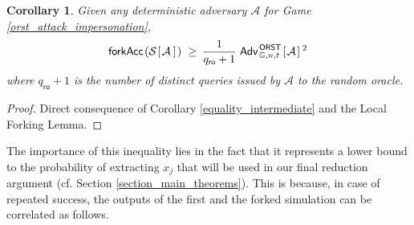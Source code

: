 \documentclass[psamsfonts, reqno]{amsart}
\newtheorem{cor}[thm]{Corollary}
\theoremstyle{definition}
\theoremstyle{remark}
\numberwithin{equation}{section}
\begin{document}
\begin{cor}\label{intermediate_lower_bound}
Given any deterministic adversary $\mathcal{A}$
for Game \ref{orst_attack_impersonation},
\vspace{5pt}
\begin{equation}
	\mathsf{forkAcc}\hspace{1pt}(
		\mathcal{S}
			\hspace{1pt}[
				\hspace{1pt}\mathcal{A}
		\hspace{2pt}]\hspace{1pt})
	\hspace{3pt}
	\ge
	\hspace{2pt}
	\frac{1}{q_{\mathsf{ro}} + 1}
	\hspace{3pt}
	\mathsf{Adv}
		_{\hspace{1pt}\mathbb{G}, n, t}
		^{\hspace{1pt}\mathsf{ORST}}\hspace{1pt}
		[
			\hspace{1pt}
			\mathcal{A}
			\hspace{1pt}
		]^{\hspace{2pt}2} \hspace{1pt}
\vspace{5pt}
\end{equation}
where $q_{\mathsf{ro}} + 1$ is the number
of distinct queries issued by $\mathcal{A}$
to the random oracle.
\end{cor}

\begin{proof}
Direct consequence of Corollary \ref{equality_intermediate}
and the Local Forking Lemma.
\vspace{0pt}
\end{proof}

\noindent
The importance of this inequality lies in the fact that it
represents a lower bound to the probability of extracting $x_j$
that will be used in our final reduction argument
(cf. Section \ref{section_main_theorems}). This is because,
in case of repeated success, the outputs of the first
and the forked simulation can be correlated as follows.
\end{document}
